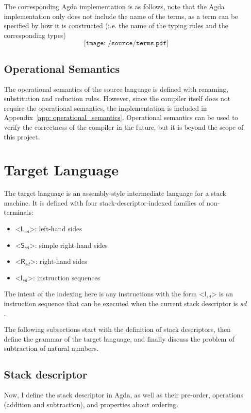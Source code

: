 \documentclass[12pt,a4paper]{report}
\theoremstyle{definition}
\newcommand{\bracket}[1]{\mathord{<} #1 \mathord{>}}
\begin{document}
        The corresponding Agda implementation is as follows, note that the Agda implementation only does not include the name of the terms, as a term can be specified by how it is constructed (i.e. the name of the typing rules and the corresponding types)
        \[\texttt{[image: /source/terms.pdf]}\]

        \subsection{Operational Semantics}
        The operational semantics of the source language is defined with renaming, substitution and reduction rules. However, since the compiler itself does not require the operational semantics, the implementation is included in Appendix~\ref{app: operational_semantics}. Operational semantics can be used to verify the correctness of the compiler in the future, but it is beyond the scope of this project.


    \section{Target Language} \label{sec: target}
    The target language is an assembly-style intermediate language for a stack machine. It is defined with four stack-descriptor-indexed families of non-terminals: 
    \begin{itemize}
        \item 
            $\bracket{\textsf{L}_{\textit{sd}}}$: left-hand sides
        \item 
            $\bracket{\textsf{S}_{\textit{sd}}}$: simple right-hand sides
        \item
            $\bracket{\textsf{R}_{\textit{sd}}}$: right-hand sides
        \item
            $\bracket{\textsf{I}_{\textit{sd}}}$: instruction sequences
    \end{itemize}
    The intent of the indexing here is any instructions with the form $\bracket{\textsf{I}_{\textit{sd}}}$ is an instruction sequence that can be executed when the current stack descriptor is $\textit{sd}$. 

    The following subsections start with the definition of stack descriptors, then define the grammar of the target language, and finally discuss the problem of subtraction of natural numbers.

    \subsection{Stack descriptor}
    Now, I define the stack descriptor in Agda, as well as their pre-order, operations (addition and subtraction), and properties about ordering.
\end{document}
